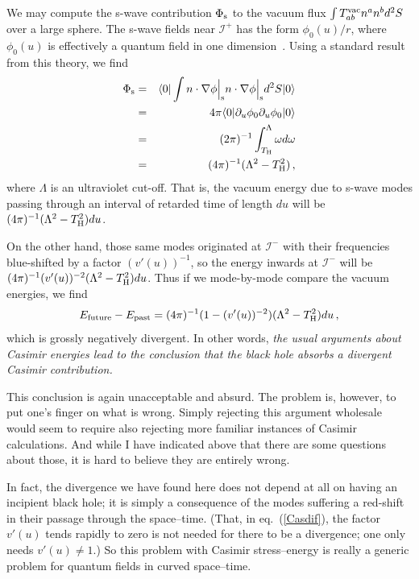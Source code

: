 \documentclass[12pt]{article}
\newcommand{\scrif}{{{\mathscr I}^{+}}}
\newcommand{\scrip}{{{\mathscr I}^{-}}}
\begin{document}
We may compute the s-wave contribution $\Phi _{\rm s}$
to the 
vacuum flux $\int T_{ab}^{\rm vac} n^an^b d^2S$ over a large sphere.  The s-wave fields near $\scrif$ has the form $\phi _0(u)/r$, where $\phi _0(u)$ is effectively a quantum field in one dimension~\citep{Helfer:2003va}.  Using a standard result from this theory, we find
\begin{eqnarray}
  \Phi _{\rm s}&=&\langle 0|\int n\cdot\nabla\phi \Bigr|_{\rm s} 
n\cdot\nabla\phi \Bigr|_{\rm s} d^2S|0\rangle\nonumber\\
  &=&4\pi\langle 0|\partial _u\phi _0\partial _u\phi _0|0\rangle
  \nonumber\\
&=&(2\pi )^{-1}\int _{T_{\rm H}}^\Lambda\omega d\omega\nonumber\\
&=&(4\pi )^{-1}(\Lambda ^2-T_{\rm H}^2)\, ,
\end{eqnarray}
where $\Lambda$ is an ultraviolet cut-off.
That is, the vacuum energy due to s-wave modes passing through an interval of retarded time of length $du$ will be $(4\pi )^{-1}(\Lambda ^2-T_{\rm H}^2) du$.

On the other hand, those same modes originated at $\scrip$ with their frequencies blue-shifted by a factor $(v'(u))^{-1}$, so the energy inwards at $\scrip$ will be $(4\pi )^{-1}(v'(u))^{-2}(\Lambda ^2 -T_{\rm H}^2) du$.  Thus if we mode-by-mode compare the vacuum energies, we find
\begin{equation}\label{Casdif}
  E_{\rm future}-E_{\rm past} =(4\pi )^{-1}(1-(v'(u))^{-2})(\Lambda ^2-T_{\rm H}^2) du\, ,
\end{equation}
which is grossly negatively divergent.  In other words, {\em the usual arguments about Casimir energies lead to the conclusion that the black hole absorbs a divergent Casimir contribution.}

This conclusion is again unacceptable and absurd.  
The problem is, however, to put one's finger on what is wrong.  Simply rejecting this argument wholesale would seem to require also rejecting more familiar instances of Casimir calculations.  And while I have indicated above that there are some questions about those, it is hard to believe they are entirely wrong.

In fact, the divergence we have found here
does not depend at all on having an incipient black hole; it is simply a consequence of the modes suffering a red-shift in their passage through the space--time.  (That, in eq.~(\ref{Casdif}), the factor $v'(u)$ tends rapidly to zero is not needed for there to be a divergence; one only needs $v'(u)\not=1$.)  So this problem with Casimir stress--energy is really a generic problem for quantum fields in curved space--time.
\end{document}
